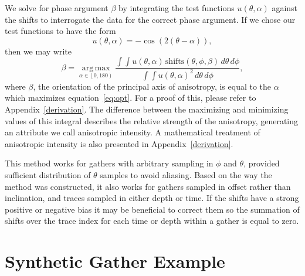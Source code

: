 
We solve for phase argument $\beta$ by integrating the test functions $u \left( \theta,\alpha \right)$ against the shifts to interrogate the data for the correct phase argument.  If we chose our test functions to have the form
\begin{equation}
\label{eq:test}
u \left( \theta,\alpha \right) = -\cos \left(2 \left( \theta-\alpha \right) \right) ,
\end{equation}
then we may write
\begin{equation}
\label{eq:opt}
\beta = \underset{\alpha \in \left[0,180 \right)}{\operatorname{arg \, max}}  \frac{  \int \int u \left(\theta,\alpha  \right) \, \textrm{shifts} \left( \theta,\phi,\beta \right) \, d\theta \, d\phi}{\int \int u \left( \theta, \alpha \right)^2 \, d\theta \, d\phi} ,
\end{equation}
where $\beta$, the orientation of the principal axis of anisotropy, is equal to the $\alpha$ which maximizes equation~\ref{eq:opt}.  For a proof of this, please refer to Appendix~\ref{derivation}. The difference between the maximizing and minimizing values of this integral describes the relative strength of the anisotropy, generating an attribute we call anisotropic intensity.  A mathematical treatment of anisotropic intensity is also presented in Appendix~\ref{derivation}.

This method works for gathers with arbitrary sampling in $\phi$ and $\theta$, provided sufficient distribution of $\theta$ samples to avoid aliasing. Based on the way the method was constructed, it also works for gathers sampled in offset rather than inclination, and traces sampled in either depth or time.  If the shifts have a strong positive or negative bias it may be beneficial to correct them so the summation of shifts over the trace index for each time or depth within a gather is equal to zero.


\section{Synthetic Gather Example}

